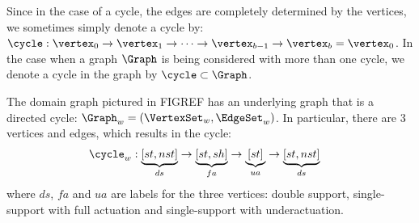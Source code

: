 Since in the case of a cycle, the edges are completely determined by the vertices, we sometimes simply denote a cycle by: $\cycle : \vertex_0 \to \vertex_1 \to \cdots \to \vertex_{b-1} \to \vertex_b = \vertex_0$. In the case when a graph $\Graph$ is being considered with more than one cycle, we denote a cycle in the graph by $\cycle \subset \Graph$.

\begin{myexample}
 The domain graph pictured in FIGREF has an underlying graph that is a directed cycle: $\Graph_w = (\VertexSet_w,\EdgeSet_w)$. In particular, there are 3 vertices and edges, which results in the cycle:
 \begin{align}
    \cycle_w &:  \underbrace{[st,nst]}_{ds} \to  \underbrace{[st,sh]}_{fa} \to  \underbrace{[st]}_{ua} \to  \underbrace{[st,nst]}_{ds}
 \end{align}
 where $ds$, $fa$ and $ua$ are labels for the three vertices: double support, single-support with full actuation and single-support with underactuation.
\end{myexample}

